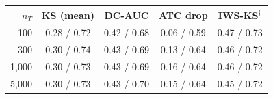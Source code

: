 \begin{tabular}{rcccc}
\toprule
$n_T$ & KS (mean) & DC-AUC & ATC drop & IWS-KS$^\dagger$ \\
\midrule
100 & 0.28 / 0.72 & 0.42 / 0.68 & 0.06 / 0.59 & 0.47 / 0.73 \\
300 & 0.30 / 0.74 & 0.43 / 0.69 & 0.13 / 0.64 & 0.46 / 0.72 \\
1{,}000 & 0.30 / 0.73 & 0.43 / 0.69 & 0.16 / 0.64 & 0.46 / 0.72 \\
5{,}000 & 0.30 / 0.73 & 0.43 / 0.70 & 0.15 / 0.64 & 0.45 / 0.72 \\
\bottomrule
\end{tabular}